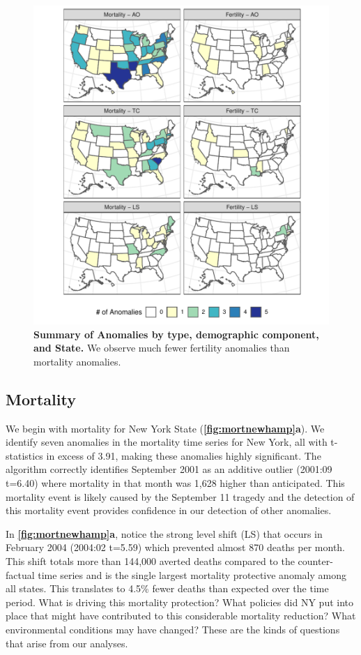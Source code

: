 \documentclass[12pt]{article}
\begin{document}
\begin{figure}
\centering
\includegraphics{manuscript_files/figure-latex/AnomalyMap-1.pdf}
\caption{\textbf{Summary of Anomalies by type, demographic component, and State.}
We observe much fewer fertility anomalies than mortality anomalies.
\label{fig:summap}}
\end{figure}

\hypertarget{mortality}{%
\subsection{Mortality}\label{mortality}}

We begin with mortality for New York State
(\textbf{\autoref{fig:mortnewhamp}a}). We identify seven anomalies in
the mortality time series for New York, all with t-statistics in excess
of 3.91, making these anomalies highly significant. The algorithm
correctly identifies September 2001 as an additive outlier (2001:09
t=6.40) where mortality in that month was 1,628 higher than anticipated.
This mortality event is likely caused by the September 11 tragedy and
the detection of this mortality event provides confidence in our
detection of other anomalies.

In \textbf{\autoref{fig:mortnewhamp}a}, notice the strong level shift
(LS) that occurs in February 2004 (2004:02 t=5.59) which prevented
almost 870 deaths per month. This shift totals more than 144,000 averted
deaths compared to the counter-factual time series and is the single
largest mortality protective anomaly among all states. This translates
to 4.5\% fewer deaths than expected over the time period. What is
driving this mortality protection? What policies did NY put into place
that might have contributed to this considerable mortality reduction?
What environmental conditions may have changed? These are the kinds of
questions that arise from our analyses.
\end{document}
